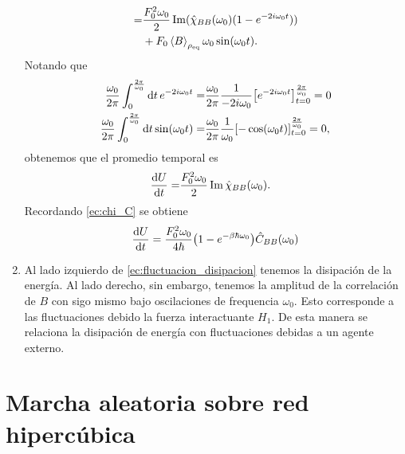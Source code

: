 \documentclass{article}
\begin{document}
\begin{enumerate}
\begin{align}
\begin{split}
=&\frac{F_0^2\omega_0}{2}\Im(\hat{\chi}_{BB}(\omega_0)(1-e^{-2i\omega_0t}))\\
&+F_0\ev{B}_{\rho_\text{eq}}\omega_0\sin(\omega_0t).
\end{split}
\end{align}
Notando que 
\begin{align}
\begin{split}
\frac{\omega_0}{2\pi}\int_0^{\frac{2\pi}{\omega_0}}\dd{t}e^{-2i\omega_0t}=&\frac{\omega_0}{2\pi}\frac{1}{-2i\omega_0}\qty[e^{-2i\omega_0t}]_{t=0}^{\frac{2\pi}{\omega_0}}=0\\
\frac{\omega_0}{2\pi}\int_0^{\frac{2\pi}{\omega_0}}\dd{t}\sin(\omega_0 t)=&\frac{\omega_0}{2\pi}\frac{1}{\omega_0}\qty[-\cos(\omega_0t)]_{t=0}^{\frac{2\pi}{\omega_0}}=0,
\end{split}
\end{align}
obtenemos que el promedio temporal es
\begin{equation}
\begin{split}
\dv{U}{t}=&\frac{F_0^2\omega_0}{2}\Im\hat{\chi}_{BB}(\omega_0).
\end{split}
\end{equation}
Recordando \eqref{ec:chi_C} se obtiene
\begin{equation}\label{ec:fluctuacion_disipacion}
\dv{U}{t}=\frac{F_0^2\omega_0}{4\hbar}\qty(1-e^{-\beta\hbar\omega_0})\hat{C}_{BB}(\omega_0)
\end{equation}

\item Al lado izquierdo de \eqref{ec:fluctuacion_disipacion} tenemos la disipación de la energía. Al lado derecho, sin embargo, tenemos la amplitud de la correlación de $B$ con sigo mismo bajo oscilaciones de frequencia $\omega_0$. Esto corresponde a las fluctuaciones debido la fuerza interactuante $H_1$. De esta manera se relaciona la disipación de energía con fluctuaciones debidas a un agente externo.

\end{enumerate}

\section{Marcha aleatoria sobre red hipercúbica}
\end{document}
